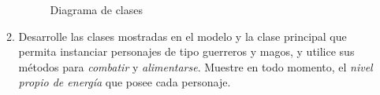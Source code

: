 \documentclass{article}
\begin{document}
\begin{enumerate}
\begin{enumerate}
\begin{figure}[htbp!]
\begin{center}
				\caption{{\small Diagrama de clases}}\label{fig-modelo}
			\end{center}
		\end{figure}
		\item[] Desarrolle las clases mostradas en el modelo y la clase principal que permita instanciar personajes de tipo guerreros y magos, y utilice sus m\'etodos para \emph{combatir} y \emph{alimentarse}. Muestre en todo momento, el \emph{nivel propio de energ\'ia} que posee cada personaje.
	    \end{enumerate}

\end{enumerate}
\end{document}

